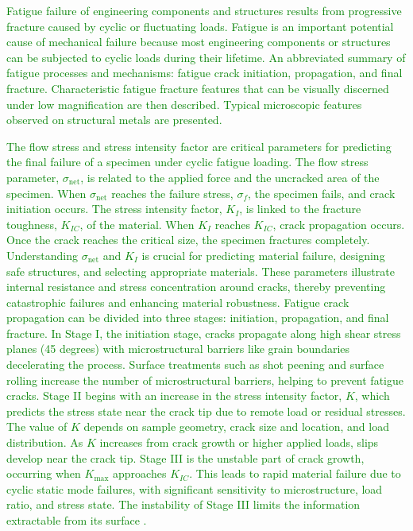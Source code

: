 \documentclass[preprint,12pt]{elsarticle}
\begin{document}
\textcolor{green}{Fatigue failure of engineering components and structures results from progressive fracture caused by cyclic or fluctuating loads. Fatigue is an important potential cause of mechanical failure because most engineering components or structures can be subjected to cyclic loads during their lifetime.
An abbreviated summary of fatigue processes and mechanisms: fatigue crack initiation, propagation, and final fracture. Characteristic fatigue fracture features that can be visually discerned under low magnification are then described.
Typical microscopic features observed on structural metals are presented.}

\textcolor{green}{
The flow stress and stress intensity factor are critical parameters for predicting the final failure of a specimen under cyclic fatigue loading. The flow stress parameter, \(\sigma_{\text{net}}\), is related to the applied force and the uncracked area of the specimen. When \(\sigma_{\text{net}}\) reaches the failure stress, \(\sigma_f\), the specimen fails, and crack initiation occurs. The stress intensity factor, \(K_I\), is linked to the fracture toughness, \(K_{IC}\), of the material. When \(K_I\) reaches \(K_{IC}\), crack propagation occurs. Once the crack reaches the critical size, the specimen fractures completely. Understanding \(\sigma_{\text{net}}\) and \(K_I\) is crucial for predicting material failure, designing safe structures, and selecting appropriate materials. These parameters illustrate internal resistance and stress concentration around cracks, thereby preventing catastrophic failures and enhancing material robustness.}
\textcolor{green}{
Fatigue crack propagation can be divided into three stages: initiation, propagation, and final fracture. In Stage I, the initiation stage, cracks propagate along high shear stress planes (45 degrees) with microstructural barriers like grain boundaries decelerating the process. Surface treatments such as shot peening and surface rolling increase the number of microstructural barriers, helping to prevent fatigue cracks. Stage II begins with an increase in the stress intensity factor, \(K\), which predicts the stress state near the crack tip due to remote load or residual stresses. The value of \(K\) depends on sample geometry, crack size and location, and load distribution. As \(K\) increases from crack growth or higher applied loads, slips develop near the crack tip. Stage III is the unstable part of crack growth, occurring when \(K_{\text{max}}\) approaches \(K_{IC}\). This leads to rapid material failure due to cyclic static mode failures, with significant sensitivity to microstructure, load ratio, and stress state. The instability of Stage III limits the information extractable from its surface \cite{newman1981empirical}.}
\end{document}
